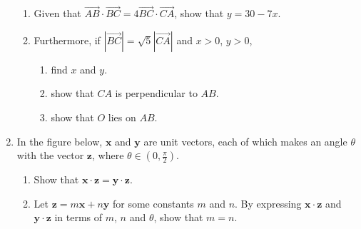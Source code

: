 \documentclass[11pt, a4paper, oneside]{exam}
\theoremstyle{definition}\newtheorem{define}{Definition}[section]
\theoremstyle{remark}\newtheorem{remark}{Remark}
\theoremstyle{definition}\newtheorem{example}{Example}[subsection]
\theoremstyle{definition}\newtheorem{notation}{Notation}[section]
\theoremstyle{definition}\newtheorem{theorem}{Theorem}[section]
\theoremstyle{definition}\newtheorem{corollary}{Corollary}[section]
\begin{document}
\begin{enumerate}
\begin{enumerate}
  \item Given that $\overrightarrow{AB} \cdot \overrightarrow{BC} = 4 \overrightarrow{BC} \cdot \overrightarrow{CA}$, show that $y = 30 - 7x$.\\

  \item Furthermore, if $|\overrightarrow{BC}| = \sqrt{5}|\overrightarrow{CA}|$ and $x>0$, $y>0$,
	\begin{enumerate}
    \item find $x$ and $y$.\\
    \item show that $CA$ is perpendicular to $AB$.\\
    \item show that $O$ lies on $AB$.\\
	\end{enumerate}
\end{enumerate}

\item In the figure below, $\mathbf{x}$ and $\mathbf{y}$ are unit vectors, each of which makes an angle $\theta$ with the vector $\mathbf{z}$, where $\theta \in \left(0,\frac{\pi}{2}\right)$.

\begin{center}
\end{center}
\begin{enumerate}
  \item Show that $\mathbf{x}\cdot \mathbf{z} = \mathbf{y}\cdot \mathbf{z}$.\\

  \item Let $\mathbf{z} = m\mathbf{x} + n\mathbf{y}$ for some constants $m$ and $n$. By expressing $\mathbf{x}\cdot\mathbf{z}$ and $\mathbf{y}\cdot\mathbf{z}$ in terms of $m$, $n$ and $\theta$, show that $m=n$.\\
\end{enumerate}


\end{enumerate}
\end{document}
